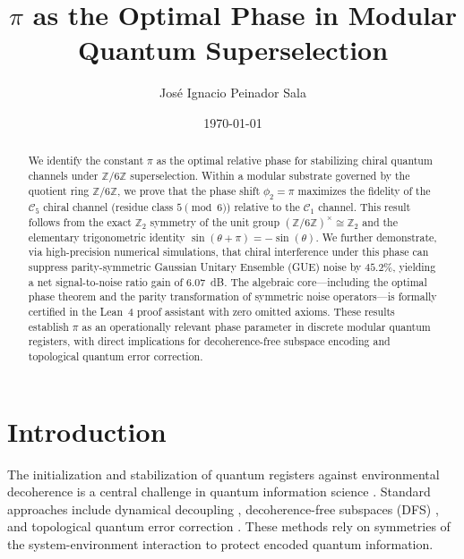 \documentclass[aps,pra,twocolumn,10pt,superscriptaddress]{revtex4-2}
\newcommand{\Zmod}{\mathbb{Z}/6\mathbb{Z}}
\begin{document}
\title{\texorpdfstring{$\pi$}{pi} as the Optimal Phase in Modular Quantum Superselection}

\author{Jos\'{e} Ignacio Peinador Sala}

\date{\today}

\begin{abstract}
We identify the constant $\pi$ as the optimal relative phase for stabilizing chiral quantum channels under $\Zmod$ superselection. Within a modular substrate governed by the quotient ring $\Zmod$, we prove that the phase shift $\phi_2 = \pi$ maximizes the fidelity of the $\mathcal{C}_5$ chiral channel (residue class $5 \pmod 6$) relative to the $\mathcal{C}_1$ channel. This result follows from the exact $\mathbb{Z}_2$ symmetry of the unit group $(\Zmod)^\times \cong \mathbb{Z}_2$ and the elementary trigonometric identity $\sin(\theta + \pi) = -\sin(\theta)$. We further demonstrate, via high-precision numerical simulations, that chiral interference under this phase can suppress parity-symmetric Gaussian Unitary Ensemble (GUE) noise by $45.2\%$, yielding a net signal-to-noise ratio gain of $6.07$~dB. The algebraic core---including the optimal phase theorem and the parity transformation of symmetric noise operators---is formally certified in the Lean~4 proof assistant with zero omitted axioms. These results establish $\pi$ as an operationally relevant phase parameter in discrete modular quantum registers, with direct implications for decoherence-free subspace encoding and topological quantum error correction.
\end{abstract}

\maketitle

\section{Introduction}

The initialization and stabilization of quantum registers against environmental decoherence is a central challenge in quantum information science \cite{Lidar1998,Knill2005}. Standard approaches include dynamical decoupling \cite{Viola1999}, decoherence-free subspaces (DFS) \cite{Zanardi1997,Lidar1998}, and topological quantum error correction \cite{Kitaev2003}. These methods rely on symmetries of the system-environment interaction to protect encoded quantum information.
\end{document}
